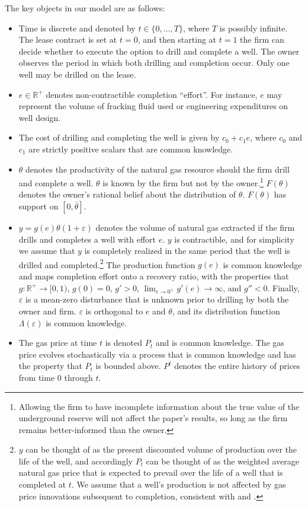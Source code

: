 \documentclass[12pt]{article}
\begin{document}
The key objects in our model are as follows:

\begin{itemize}
\item Time is discrete and denoted by $t\in\{0,...,T\}$, where $T$ is possibly infinite. The lease contract is set at $t=0$, and then starting at $t=1$ the firm can decide whether to execute the option to drill and complete a well. The owner observes the period in which both drilling and completion occur. Only one well may be drilled on the lease.
\item $e\in\mathbb{R}^+$ denotes non-contractible completion ``effort''. For instance, $e$ may represent the volume of fracking fluid used or engineering expenditures on well design.
\item The cost of drilling and completing the well is given by $c_0 + c_1e$, where $c_0$ and $c_1$ are strictly positive scalars that are common knowledge.
\item $\theta$ denotes the productivity of the natural gas resource should the firm drill and complete a well. $\theta$ is known by the firm but not by the owner.\footnote{Allowing the firm to have incomplete information about the true value of the underground reserve will not affect the paper's results, so long as the firm remains better-informed than the owner.} $F(\theta)$ denotes the owner's rational belief about the distribution of $\theta$. $F(\theta)$ has support on $[0,\bar{\theta}]$.
\item $y = g(e)\theta(1+\varepsilon)$ denotes the volume of natural gas extracted if the firm drills and completes a well with effort $e$. $y$ is contractible, and for simplicity we assume that $y$ is completely realized in the same period that the well is drilled and completed.\footnote{$y$ can be thought of as the present discounted volume of production over the life of the well, and accordingly $P_t$ can be thought of as the weighted average natural gas price that is expected to prevail over the life of a well that is completed at $t$. We assume that a well's production is not affected by gas price innovations subsequent to completion, consistent with \citet{bib:aks2018} and \citet{bib:newell}.} The production function $g(e)$ is common knowledge and maps completion effort onto a recovery ratio, with the properties that $g:\mathbb{R}^+\to[0,1)$, $g(0)=0$, $g'>0$, $\lim_{e\to 0^+}g'(e)\to\infty$, and $g''<0$. Finally, $\varepsilon$ is a mean-zero disturbance that is unknown prior to drilling by both the owner and firm. $\varepsilon$ is orthogonal to $e$ and $\theta$, and its distribution function $\Lambda(\varepsilon)$ is common knowledge.
\item The gas price at time $t$ is denoted $P_t$ and is common knowledge. The gas price evolves stochastically via a process that is common knowledge and has the property that $P_t$ is bounded above. $P^t$ denotes the entire history of prices from time 0 through $t$.
\end{itemize}
\end{document}
